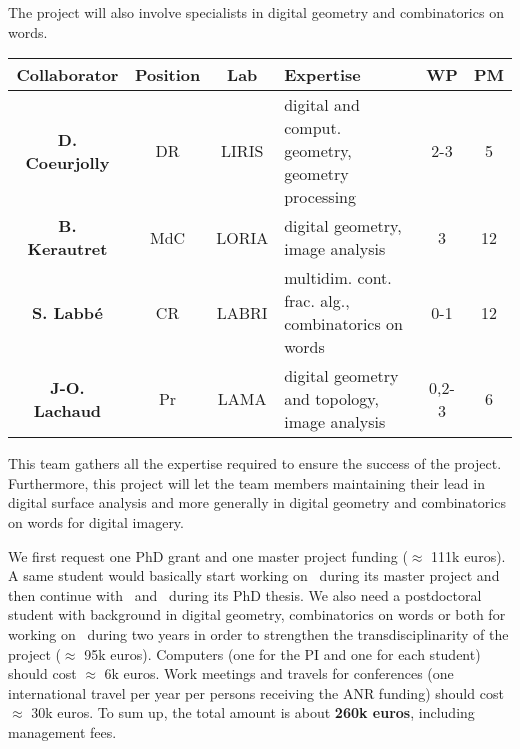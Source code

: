 The project will also involve specialists in digital geometry and combinatorics on words. 
\begin{table}[h]
\small
\centering
\begin{tabular}{|ccclcc|}
\hline
Collaborator & Position & Lab & Expertise & WP & PM \\ \hline
\hline
\textbf{D. Coeurjolly} & DR & LIRIS & digital and comput. geometry, geometry processing & 2-3 & 5 \\ \hline
\textbf{B. Kerautret} & MdC & LORIA & digital geometry, image analysis & 3 & 12 \\ \hline
\textbf{S. Labb\'{e}} & CR & LABRI & multidim. cont. frac. alg., combinatorics on words & 0-1 & 12 \\ \hline
\textbf{J-O. Lachaud} & Pr & LAMA & digital geometry and topology, image analysis & 0,2-3 & 6 \\ \hline
\hline
\end{tabular}
\normalsize
\end{table}


This team gathers all the expertise required to ensure the success of the project.
Furthermore, this project will let the team members maintaining their lead in digital surface analysis 
and more generally in digital geometry and combinatorics on words for digital imagery. 


We first request one PhD grant and one master project funding ($\approx$ 111k euros). A same student would basically start working on \wpPPA~during its master project and then continue with \wpEstim~and \wpScale~during its PhD thesis. We also need a postdoctoral student with background in digital geometry, combinatorics on words or both for working on \wpPattern~during two years in order to strengthen the transdisciplinarity of the project ($\approx$ 95k euros). 
Computers (one for the PI and one for each student) should cost $\approx$ 6k euros. Work meetings and travels for conferences (one international travel per year per persons receiving the ANR funding) should cost $\approx$ 30k euros. 
To sum up, the total amount is about \textbf{260k euros}, including management fees. 
